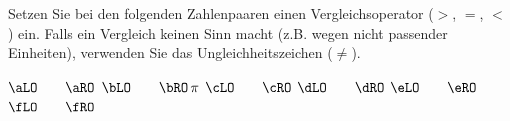 Setzen Sie bei den folgenden Zahlenpaaren einen Vergleichsoperator ($>$, $=$, $<$) ein. Falls ein Vergleich keinen Sinn macht (z.B. wegen nicht passender Einheiten), verwenden Sie das Ungleichheitszeichen ($\neq$).

\begin{abcliste}
\abc $\aLO \qquad \aRO$
\abc $\bLO \qquad \bRO\,\pi$
\abc $\cLO \qquad \cRO$
\abc $\dLO \qquad \dRO$
\abc $\eLO \qquad \eRO$
\abc $\fLO \qquad \fRO$
\end{abcliste}
